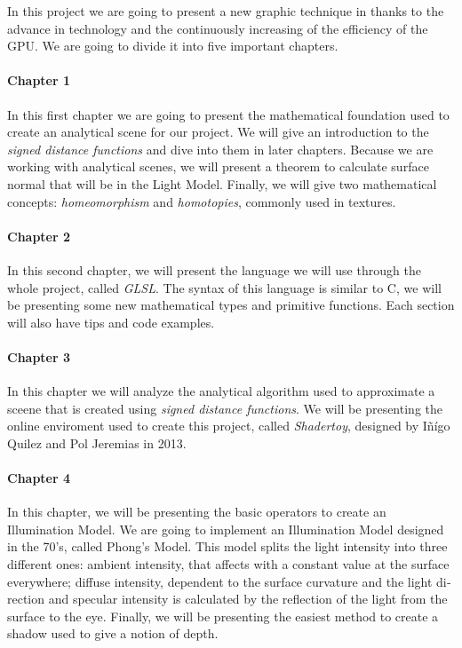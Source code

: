 \begin{otherlanguage}{english}
In this project we are going to present a new graphic technique in thanks to the advance in technology and the continuously increasing of the efficiency of the GPU. We are going to divide it into five important chapters.

\paragraph{Chapter 1} In this first chapter we are going to present the mathematical foundation used to create an analytical scene for our project. We will give an introduction to the \textit{signed distance functions} and dive into them in later chapters. Because we are working with analytical scenes, we will present a theorem to calculate surface normal that will be in the Light Model. Finally, we will give two mathematical concepts: \textit{homeomorphism} and \textit{homotopies}, commonly used in textures.

\paragraph{Chapter 2} In this second chapter, we will present the language we will use through the whole project, called \textit{GLSL}. The syntax of this language is similar to C, we will be presenting some new mathematical types and primitive functions. Each section will also have tips and code examples.

\paragraph{Chapter 3} In this chapter we will analyze the analytical algorithm used to approximate a sceene that is created using \textit{signed distance functions}. We will be presenting the online enviroment used to create this project, called \textit{Shadertoy}, designed by Iñígo Quilez and Pol Jeremias in 2013.

\paragraph{Chapter 4} In this chapter, we will be presenting the basic operators to create an Illumination Model. We are going to implement an Illumination Model designed in the 70's, called Phong's Model. This model splits the light intensity into three different ones: ambient intensity, that affects with a constant value at the surface everywhere; diffuse intensity, dependent to the surface curvature and the light direction and specular intensity is calculated by the reflection of the light from the surface to the eye. Finally, we will be presenting the easiest method to create a shadow used to give a notion of depth.


\end{otherlanguage}
